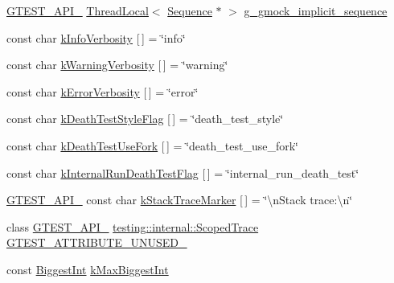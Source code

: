 \begin{DoxyCompactItemize}
\item 
\hyperlink{gtest-port_8h_aa73be6f0ba4a7456180a94904ce17790}{G\+T\+E\+S\+T\+\_\+\+A\+P\+I\+\_\+} \hyperlink{classtesting_1_1internal_1_1_thread_local}{Thread\+Local}$<$ \hyperlink{classtesting_1_1_sequence}{Sequence} $\ast$ $>$ \hyperlink{namespacetesting_1_1internal_af4407fe8aeb1e43b2f58940736a20590}{g\+\_\+gmock\+\_\+implicit\+\_\+sequence}
\item 
const char \hyperlink{namespacetesting_1_1internal_a96274a788ffc75a6dffdfa8aa1f34fb9}{k\+Info\+Verbosity} \mbox{[}$\,$\mbox{]} = \char`\"{}info\char`\"{}
\item 
const char \hyperlink{namespacetesting_1_1internal_ad9386ccda6b6deac2f7b84784d3088c0}{k\+Warning\+Verbosity} \mbox{[}$\,$\mbox{]} = \char`\"{}warning\char`\"{}
\item 
const char \hyperlink{namespacetesting_1_1internal_a3d730761274e7b80dd66e5014171fcb5}{k\+Error\+Verbosity} \mbox{[}$\,$\mbox{]} = \char`\"{}error\char`\"{}
\item 
const char \hyperlink{namespacetesting_1_1internal_a008ebfe0c0347d65e5e06e4d310981b3}{k\+Death\+Test\+Style\+Flag} \mbox{[}$\,$\mbox{]} = \char`\"{}death\+\_\+test\+\_\+style\char`\"{}
\item 
const char \hyperlink{namespacetesting_1_1internal_a32051e2574562b548be3e26a52eaa553}{k\+Death\+Test\+Use\+Fork} \mbox{[}$\,$\mbox{]} = \char`\"{}death\+\_\+test\+\_\+use\+\_\+fork\char`\"{}
\item 
const char \hyperlink{namespacetesting_1_1internal_a8572303d929880adf30db00952e1c45d}{k\+Internal\+Run\+Death\+Test\+Flag} \mbox{[}$\,$\mbox{]} = \char`\"{}internal\+\_\+run\+\_\+death\+\_\+test\char`\"{}
\item 
\hyperlink{gtest-port_8h_aa73be6f0ba4a7456180a94904ce17790}{G\+T\+E\+S\+T\+\_\+\+A\+P\+I\+\_\+} const char \hyperlink{namespacetesting_1_1internal_abb38528ca6a45df265b19f5ccb3d16d9}{k\+Stack\+Trace\+Marker} \mbox{[}$\,$\mbox{]} = \char`\"{}\textbackslash{}n\+Stack trace\+:\textbackslash{}n\char`\"{}
\item 
class \hyperlink{gtest-port_8h_aa73be6f0ba4a7456180a94904ce17790}{G\+T\+E\+S\+T\+\_\+\+A\+P\+I\+\_\+} \hyperlink{classtesting_1_1internal_1_1_scoped_trace}{testing\+::internal\+::\+Scoped\+Trace} \hyperlink{namespacetesting_1_1internal_a581ac897511489c75a06aa328dcfb62f}{G\+T\+E\+S\+T\+\_\+\+A\+T\+T\+R\+I\+B\+U\+T\+E\+\_\+\+U\+N\+U\+S\+E\+D\+\_\+}
\item 
const \hyperlink{namespacetesting_1_1internal_a05c6bd9ede5ccdf25191a590d610dcc6}{Biggest\+Int} \hyperlink{namespacetesting_1_1internal_ad901880198832bc166d2493096b451f7}{k\+Max\+Biggest\+Int}

\end{DoxyCompactItemize}

